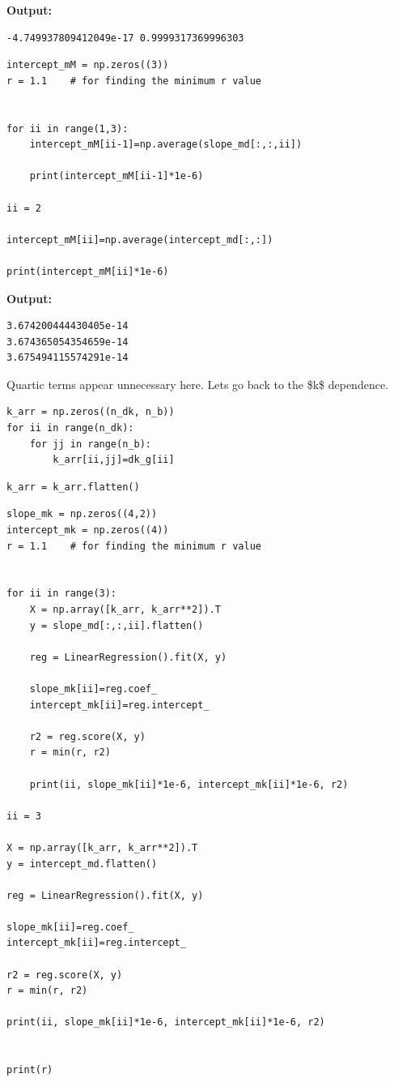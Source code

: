 \documentclass{article}
\begin{document}
\textbf{Output:}\begin{verbatim}
-4.749937809412049e-17 0.9999317369996303

\end{verbatim}

\begin{lstlisting}
intercept_mM = np.zeros((3))
r = 1.1    # for finding the minimum r value


for ii in range(1,3):
    intercept_mM[ii-1]=np.average(slope_md[:,:,ii])

    print(intercept_mM[ii-1]*1e-6)

ii = 2

intercept_mM[ii]=np.average(intercept_md[:,:])

print(intercept_mM[ii]*1e-6)\end{lstlisting}

\textbf{Output:}\begin{verbatim}
3.674200444430405e-14
3.674365054354659e-14
3.675494115574291e-14

\end{verbatim}

Quartic terms appear unnecessary here. Lets go back to the \$k\$ dependence.

\begin{lstlisting}
k_arr = np.zeros((n_dk, n_b))
for ii in range(n_dk):
    for jj in range(n_b):
        k_arr[ii,jj]=dk_g[ii]\end{lstlisting}

\begin{lstlisting}
k_arr = k_arr.flatten()\end{lstlisting}

\begin{lstlisting}
slope_mk = np.zeros((4,2))
intercept_mk = np.zeros((4))
r = 1.1    # for finding the minimum r value


for ii in range(3):
    X = np.array([k_arr, k_arr**2]).T
    y = slope_md[:,:,ii].flatten()

    reg = LinearRegression().fit(X, y)

    slope_mk[ii]=reg.coef_
    intercept_mk[ii]=reg.intercept_

    r2 = reg.score(X, y)
    r = min(r, r2)

    print(ii, slope_mk[ii]*1e-6, intercept_mk[ii]*1e-6, r2)

ii = 3

X = np.array([k_arr, k_arr**2]).T
y = intercept_md.flatten()

reg = LinearRegression().fit(X, y)

slope_mk[ii]=reg.coef_
intercept_mk[ii]=reg.intercept_

r2 = reg.score(X, y)
r = min(r, r2)

print(ii, slope_mk[ii]*1e-6, intercept_mk[ii]*1e-6, r2)


print(r)\end{lstlisting}
\end{document}
